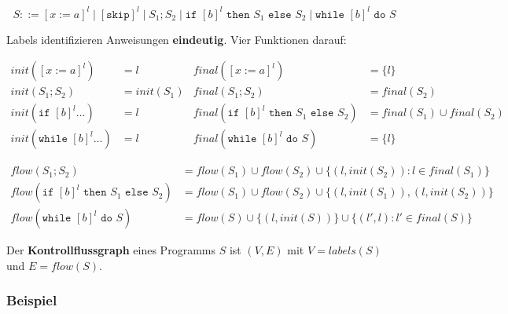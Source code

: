 \documentclass[12pt, a4paper]{article}
\begin{document}
\[
S ::= [x := a]^l \mid [\texttt{skip}]^l \mid S_1; S_2
      \mid \texttt{if } [b]^l \texttt{ then } S_1 \texttt{ else } S_2
      \mid \texttt{while } [b]^l \texttt{ do } S
\]

Labels identifizieren Anweisungen \textbf{eindeutig}. Vier Funktionen darauf:

\[
\begin{aligned}
init([x := a]^l) &= l                & final([x := a]^l) &= \{l\} \\
init(S_1; S_2) &= init(S_1)          & final(S_1; S_2) &= final(S_2) \\
init(\texttt{if } [b]^l \dots) &= l  & final(\texttt{if } [b]^l \texttt{ then } S_1 \texttt{ else } S_2) &= final(S_1) \cup final(S_2) \\
init(\texttt{while } [b]^l \dots) &= l & final(\texttt{while } [b]^l \texttt{ do } S) &= \{l\}
\end{aligned}
\]

\[
\begin{aligned}
flow(S_1; S_2) &= flow(S_1) \cup flow(S_2) \cup \{(l, init(S_2)) : l \in final(S_1)\}\\
flow(\texttt{if } [b]^l \texttt{ then } S_1 \texttt{ else } S_2)
  &= flow(S_1) \cup flow(S_2) \cup \{(l, init(S_1)), (l, init(S_2))\}\\
flow(\texttt{while } [b]^l \texttt{ do } S)
  &= flow(S) \cup \{(l, init(S))\} \cup \{(l', l) : l' \in final(S)\}
\end{aligned}
\]

\begin{definitionbox}
Der \textbf{Kontrollflussgraph} eines Programms $S$ ist $(V, E)$ mit
$V = labels(S)$ und $E = flow(S)$.
\end{definitionbox}

\subsubsection*{Beispiel}
\end{document}
